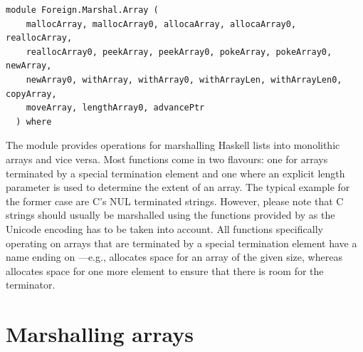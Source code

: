 \label{module:Foreign.Marshal.Array}
\haddockbeginheader
{\haddockverb\begin{verbatim}
module Foreign.Marshal.Array (
    mallocArray, mallocArray0, allocaArray, allocaArray0, reallocArray,
    reallocArray0, peekArray, peekArray0, pokeArray, pokeArray0, newArray,
    newArray0, withArray, withArray0, withArrayLen, withArrayLen0, copyArray,
    moveArray, lengthArray0, advancePtr
  ) where\end{verbatim}}
\haddockendheader

The module  provides operations for marshalling
 Haskell lists into monolithic arrays and vice versa. Most functions come in
 two flavours: one for arrays terminated by a special termination element and
 one where an explicit length parameter is used to determine the extent of an
 array. The typical example for the former case are C’s NUL terminated
 strings. However, please note that C strings should usually be marshalled
 using the functions provided by  as the Unicode encoding
 has to be taken into account. All functions specifically operating on arrays
 that are terminated by a special termination element have a name ending on
 —e.g.,  allocates space for an array of the given size,
 whereas  allocates space for one more element to ensure that
 there is room for the terminator.\par
\section{Marshalling arrays}

